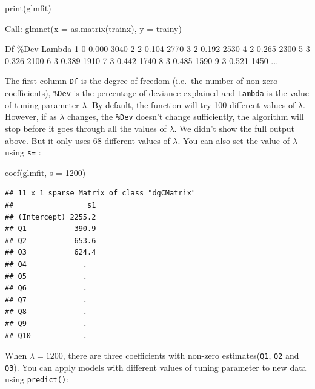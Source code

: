 \documentclass[
  12pt,
]{krantz}
\makeatletter
\newenvironment{Shaded}{\begin{snugshade}}{\end{snugshade}}
\newcommand{\AttributeTok}[1]{\textcolor[rgb]{0.61,0.61,0.61}{#1}}
\newcommand{\DecValTok}[1]{\textcolor[rgb]{0.06,0.06,0.06}{#1}}
\newcommand{\FunctionTok}[1]{\textcolor[rgb]{0,0,0}{#1}}
\newcommand{\NormalTok}[1]{#1}
\newenvironment{kframe}{%
\medskip{}
\setlength{\fboxsep}{.8em}
 \def\at@end@of@kframe{}%
 \ifinner\ifhmode%
  \def\at@end@of@kframe{\end{minipage}}%
  \begin{minipage}{\columnwidth}%
 \fi\fi%
 \def\FrameCommand##1{\hskip\@totalleftmargin \hskip-\fboxsep
 \colorbox{shadecolor}{##1}\hskip-\fboxsep
     \hskip-\linewidth \hskip-\@totalleftmargin \hskip\columnwidth}%
 \MakeFramed {\advance\hsize-\width
   \@totalleftmargin\z@ \linewidth\hsize
   \@setminipage}}%
 {\par\unskip\endMakeFramed%
 \at@end@of@kframe}
\renewenvironment{Shaded}{\begin{kframe}}{\end{kframe}}
\makeatother
\begin{document}
\begin{Shaded}
\begin{Highlighting}[]
\FunctionTok{print}\NormalTok{(glmfit)}
\end{Highlighting}
\end{Shaded}

\begin{Shaded}
\begin{Highlighting}[]
\NormalTok{Call:  glmnet(x = as.matrix(trainx), y = trainy) }

\NormalTok{   Df  \%Dev Lambda}
\NormalTok{1   0 0.000   3040}
\NormalTok{2   2 0.104   2770}
\NormalTok{3   2 0.192   2530}
\NormalTok{4   2 0.265   2300}
\NormalTok{5   3 0.326   2100}
\NormalTok{6   3 0.389   1910}
\NormalTok{7   3 0.442   1740}
\NormalTok{8   3 0.485   1590}
\NormalTok{9   3 0.521   1450}
\NormalTok{...}
\end{Highlighting}
\end{Shaded}

The first column \texttt{Df} is the degree of freedom (i.e.~the number of non-zero coefficients), \texttt{\%Dev} is the percentage of deviance explained and \texttt{Lambda} is the value of tuning parameter \(\lambda\). By default, the function will try 100 different values of \(\lambda\). However, if as \(\lambda\) changes, the \texttt{\%Dev} doesn't change sufficiently, the algorithm will stop before it goes through all the values of \(\lambda\). We didn't show the full output above. But it only uses 68 different values of \(\lambda\). You can also set the value of \(\lambda\) using \texttt{s=} :

\begin{Shaded}
\begin{Highlighting}[]
\FunctionTok{coef}\NormalTok{(glmfit, }\AttributeTok{s =} \DecValTok{1200}\NormalTok{)}
\end{Highlighting}
\end{Shaded}

\begin{verbatim}
## 11 x 1 sparse Matrix of class "dgCMatrix"
##                 s1
## (Intercept) 2255.2
## Q1          -390.9
## Q2           653.6
## Q3           624.4
## Q4             .  
## Q5             .  
## Q6             .  
## Q7             .  
## Q8             .  
## Q9             .  
## Q10            .
\end{verbatim}

When \(\lambda=1200\), there are three coefficients with non-zero estimates(\texttt{Q1}, \texttt{Q2} and \texttt{Q3}). You can apply models with different values of tuning parameter to new data using \texttt{predict()}:
\end{document}
